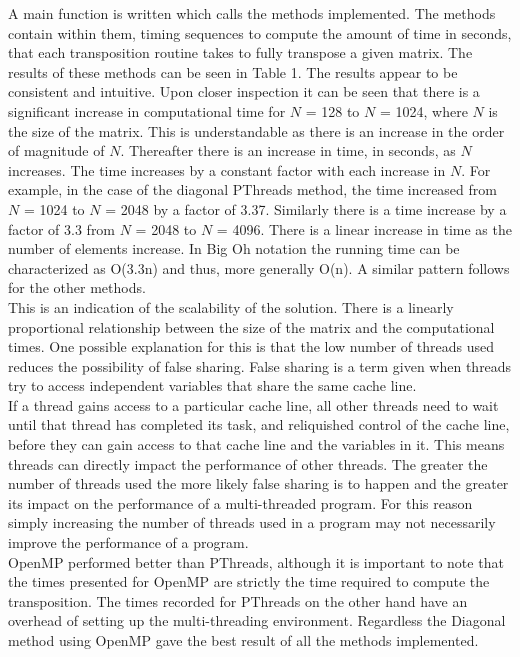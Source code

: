 \documentclass[a4paper, 11pt, onecolumn, conference]{IEEEtran}      %
\begin{document}
A main function is written which calls the methods implemented. The methods contain within them, timing sequences to compute the amount of time in seconds, that each transposition routine takes to fully transpose a given matrix. The results of these methods can be seen in Table 1. The results appear to be consistent and intuitive. Upon closer inspection it can be seen that there is a significant increase in computational time for $N$ = 128 to $N$ = 1024, where $N$ is the size of the matrix. This is understandable as there is an increase in the order of magnitude of $N$. Thereafter there is an increase in time, in seconds, as $N$ increases. The time increases by a constant factor with each increase in $N$. For example, in the case of the diagonal PThreads method, the time increased from $N$ = 1024 to $N$ = 2048 by a factor of 3.37. Similarly there is a time increase by a factor of 3.3 from $N$ = 2048 to $N$ = 4096. There is a linear increase in time as the number of elements increase. In Big Oh notation the running time can be characterized as O(3.3n) and thus, more generally O(n). A similar pattern follows for the other methods.\\

This is an indication of the scalability of the solution. There is a linearly proportional relationship between the size of the matrix and the computational times. One possible explanation for this is that the low number of threads used reduces the possibility of false sharing. False sharing is a term given when threads try to access independent variables that share the same cache line\cite{thompson_2011}.\\

If a thread gains access to a particular cache line, all other threads need to wait until that thread has completed its task, and reliquished control of the cache line, before they can gain access to that cache line and the variables in it. This means threads can directly impact the performance of other threads. The greater the number of threads used the more likely false sharing is to happen and the greater its impact on the performance of a multi-threaded program. For this reason simply increasing the number of threads used in a program may not necessarily improve the performance of a program.\\

OpenMP performed better than PThreads, although it is important to note that the times presented for OpenMP are strictly the time required to compute the transposition. The times recorded for PThreads on the other hand have an overhead of setting up the multi-threading environment. Regardless the Diagonal method using OpenMP gave the best result of all the methods implemented.
\end{document}
